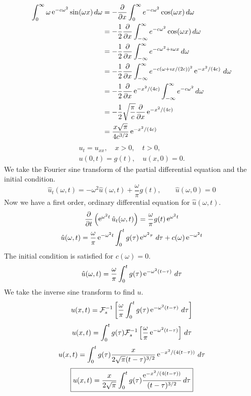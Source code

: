 {%
\begin{Solution}
  \begin{align*}
    \int_0^\infty \omega \mathop{\mathrm{e}}\nolimits^{-c \omega^2} \sin(\omega x) \,d \omega 
    &= - \frac{\partial}{\partial x} \int_0^\infty e^{-c \omega^2} \cos(\omega x) \,d \omega \\
    &= - \frac{1}{2} \frac{\partial}{\partial x} \int_{-\infty}^\infty e^{-c \omega^2} 
    \cos(\omega x) \,d \omega \\
    &= - \frac{1}{2} \frac{\partial}{\partial x} \int_{-\infty}^\infty e^{-c \omega^2 + \imath \omega x} 
    \,d \omega \\
    &= - \frac{1}{2} \frac{\partial}{\partial x} \int_{-\infty}^\infty e^{-c (\omega + \imath x/(2c))^2}
    \mathop{\mathrm{e}}\nolimits^{-x^2/(4c)} \,d \omega \\
    &= - \frac{1}{2} \frac{\partial}{\partial x} \mathop{\mathrm{e}}\nolimits^{-x^2/(4c)} \int_{-\infty}^\infty e^{-c \omega^2}
    \,d \omega \\
    &= - \frac{1}{2} \sqrt{ \frac{\pi}{c} } \frac{\partial}{\partial x} \mathop{\mathrm{e}}\nolimits^{-x^2/(4c)}\\
    &= \frac{ x \sqrt{\pi} }{ 4 c^{3/2} } \mathop{\mathrm{e}}\nolimits^{-x^2/(4c)}
  \end{align*}
  \begin{gather*}
    u_t = u_{x x}, \quad x > 0, \quad t > 0, \\
    u(0,t) = g(t), \quad u(x,0) = 0.
  \end{gather*}
  We take the Fourier sine transform of the partial differential equation
  and the initial condition.
  \[
  \hat{u}_t(\omega, t) = - \omega^2 \hat{u}(\omega, t) + \frac{\omega}{\pi} g(t),
  \qquad \hat{u}(\omega,0) = 0
  \]
  Now we have a first order, ordinary differential equation for 
  $\hat{u}(\omega,t)$.
  \begin{gather*}
    \frac{\partial}{\partial t} \left( \mathop{\mathrm{e}}\nolimits^{\omega^2 t} \hat{u}_t(\omega, t) \right) 
    = \frac{\omega}{\pi} g(t) \mathop{\mathrm{e}}\nolimits^{\omega^2 t} \\
    \hat{u}(\omega, t) = \frac{\omega}{\pi} \mathop{\mathrm{e}}\nolimits^{-\omega^2 t} \int_0^t
    g(\tau) \mathop{\mathrm{e}}\nolimits^{\omega^2 \tau} \,d\tau + c(\omega) \mathop{\mathrm{e}}\nolimits^{-\omega^2 t}
  \end{gather*}
  The initial condition is satisfied for $c(\omega) = 0$.
  \[
  \hat{u}(\omega, t) = \frac{\omega}{\pi} \int_0^t
  g(\tau) \mathop{\mathrm{e}}\nolimits^{- \omega^2 (t - \tau) } \,d\tau 
  \]
  We take the inverse sine transform to find $u$.
  \[
  u(x,t) = \mathcal{F}_s^{-1} \left[ \frac{\omega}{\pi} \int_0^t
    g(\tau) \mathop{\mathrm{e}}\nolimits^{- \omega^2 (t - \tau) } \,d\tau \right]
  \]
  \[
  u(x,t) = \int_0^t g(\tau) \mathcal{F}_s^{-1} \left[ \frac{\omega}{\pi} 
    \mathop{\mathrm{e}}\nolimits^{- \omega^2 (t - \tau) } \right] \,d\tau 
  \]
  \[
  u(x,t) = \int_0^t g(\tau) \frac{x}{2 \sqrt{\pi} (t-\tau)^{3/2} }
  \mathop{\mathrm{e}}\nolimits^{-x^2 / (4(t-\tau))} \,d\tau 
  \]
  \[
  \boxed{
    u(x,t) = \frac{x}{2 \sqrt{\pi}} \int_0^t g(\tau) 
    \frac{ \mathop{\mathrm{e}}\nolimits^{-x^2 / (4(t-\tau))} }{ (t-\tau)^{3/2} } \,d\tau 
    }
  \]
\end{Solution}








}
